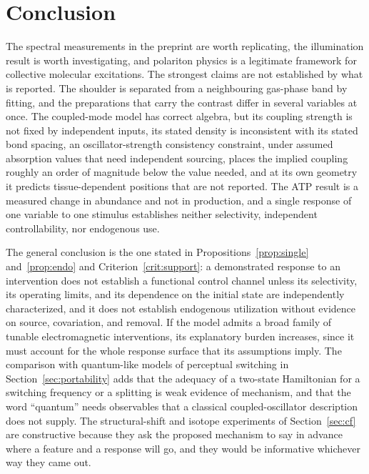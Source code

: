 \documentclass[11pt]{article}
\theoremstyle{plain}
\theoremstyle{definition}
\theoremstyle{remark}
\begin{document}
\section{Conclusion}

The spectral measurements in the preprint are worth replicating, the illumination result is worth investigating, and polariton physics is a legitimate framework for collective molecular excitations. The strongest claims are not established by what is reported. The shoulder is separated from a neighbouring gas-phase band by fitting, and the preparations that carry the contrast differ in several variables at once. The coupled-mode model has correct algebra, but its coupling strength is not fixed by independent inputs, its stated density is inconsistent with its stated bond spacing, an oscillator-strength consistency constraint, under assumed absorption values that need independent sourcing, places the implied coupling roughly an order of magnitude below the value needed, and at its own geometry it predicts tissue-dependent positions that are not reported. The ATP result is a measured change in abundance and not in production, and a single response of one variable to one stimulus establishes neither selectivity, independent controllability, nor endogenous use.

The general conclusion is the one stated in Propositions~\ref{prop:single} and~\ref{prop:endo} and Criterion~\ref{crit:support}: a demonstrated response to an intervention does not establish a functional control channel unless its selectivity, its operating limits, and its dependence on the initial state are independently characterized, and it does not establish endogenous utilization without evidence on source, covariation, and removal. If the model admits a broad family of tunable electromagnetic interventions, its explanatory burden increases, since it must account for the whole response surface that its assumptions imply. The comparison with quantum-like models of perceptual switching in Section~\ref{sec:portability} adds that the adequacy of a two-state Hamiltonian for a switching frequency or a splitting is weak evidence of mechanism, and that the word ``quantum'' needs observables that a classical coupled-oscillator description does not supply. The structural-shift and isotope experiments of Section~\ref{sec:cf} are constructive because they ask the proposed mechanism to say in advance where a feature and a response will go, and they would be informative whichever way they came out.
\end{document}

